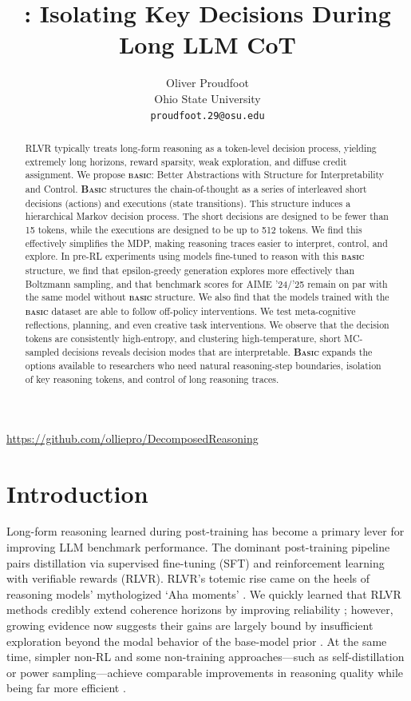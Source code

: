\documentclass[10pt,twocolumn]{article}
\title{
  {\sffamily\bfseries
    \methodnamestart{}: Isolating Key Decisions During Long LLM CoT}
}
\author{
  Oliver Proudfoot\\
  Ohio State University\\
  \texttt{proudfoot.29@osu.edu}
}
\date{}
\newcommand{\methodnamestart}{\textbf{\textsf{\textsc{Basic}}}}
\newcommand{\methodname}{\textbf{\textsf{\textsc{basic}}}}
\newcommand{\methodnamestart}{{\sffamily\bfseries B{\fontsize{0.9em}{0.9em}\selectfont ASIC}}}
\newcommand{\methodname}{{\sffamily\bfseries{\fontsize{0.95em}{0.95em}\selectfont BASIC}}}
\begin{document}
\maketitle

\begin{abstract}
  \noindent RLVR typically treats long-form reasoning as a token-level decision process,
  yielding extremely long horizons, reward sparsity, weak exploration, and diffuse credit
  assignment. We propose \methodname{}: Better Abstractions with Structure
  for Interpretability and Control. \methodnamestart{} structures the
  chain-of-thought as a series of interleaved short decisions (actions) and executions
  (state transitions). This structure induces a hierarchical Markov decision process. The
  short decisions are designed to be fewer than 15 tokens, while the executions are
  designed to be up to 512 tokens. We find this effectively simplifies the MDP, making
  reasoning traces easier to interpret, control, and explore. In pre-RL experiments using
  models fine-tuned to reason with this \methodname{} structure, we find that
  epsilon-greedy generation explores more effectively than Boltzmann sampling, and that
  benchmark scores for AIME '24/'25 remain on par with the same model without
  \methodname{} structure. We also find that the models trained with the
  \methodname{} dataset are able to follow off-policy interventions. We test
  meta-cognitive reflections, planning, and even creative task interventions. We observe
  that the decision tokens are consistently high-entropy, and clustering
  high-temperature, short MC-sampled decisions reveals decision modes that are
  interpretable. \methodnamestart{} expands the options available to researchers
  who need natural reasoning-step boundaries, isolation of key reasoning tokens, and
  control of long reasoning traces.
\end{abstract}

\url{https://github.com/olliepro/DecomposedReasoning}

\section{Introduction}
\label{sec:introduction}

Long-form reasoning learned during post-training has become a primary lever for
improving LLM benchmark performance. The dominant post-training pipeline pairs
distillation via supervised fine-tuning (SFT) and reinforcement learning
with verifiable rewards (RLVR). RLVR's totemic rise came on the heels of reasoning
models' mythologized `Aha moments' \cite{deepseekr1_2025}. We quickly learned that
RLVR methods credibly extend coherence horizons by improving reliability
\cite{wen2025rlvrreasoning}; however, growing evidence now suggests their gains are
largely bound by insufficient exploration beyond the modal behavior of the base-model
prior \cite{yue2025rlvrbase}. At the same time, simpler non-RL and some
non-training approaches---such as self-distillation or power sampling---achieve
comparable improvements in reasoning quality while being far more efficient
\cite{zhang2026embarrassing,zhao2026selfdistilledreasoner, ji2026scalablepowersamplingunlocking}.
\end{document}
